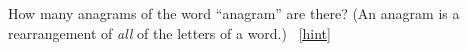 \documentclass{book}
\begin{document}
\setcounter{project}{115}
\addtocounter{project}{-1}
\begin{activity}[]\label{activity-108}
\hypertarget{p-829}{}%
How many anagrams of the word ``anagram'' are there? (An anagram is a rearrangement of \emph{all} of the letters of a word.)%
~\hfill{\tiny\hyperlink{a-115}{[hint]}\hypertarget{q-115}{}}\end{activity}
\end{document}
